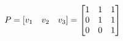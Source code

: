 \documentclass[preview]{standalone}
\begin{document}
\begin{align*}
\special{dvisvgm:raw <g id='unique000'>}P = [v_1 \quad v_2 \quad v_3] =  \special{dvisvgm:raw </g>}\special{dvisvgm:raw <g id='unique001'>}\begin{bmatrix} 1 & 1 & 1 \\ 0 & 1 & 1 \\ 0 & 0 & 1 \end{bmatrix}\special{dvisvgm:raw </g>}
\end{align*}
\end{document}

